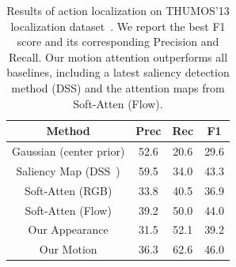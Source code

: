 \documentclass[10pt,twocolumn,letterpaper]{article}
\begin{document}
\begin{table}
\centering
\footnotesize
\begin{tabular}{c|ccc}
Method                                  & Prec        & Rec   & F1    \\ \hline 
Gaussian (center prior)                 & 52.6        & 20.6     & 29.6  \\ 
Saliency Map (DSS~\cite{hou2017deeply}) & 59.5        & 34.0     & 43.3  \\ 
Soft-Atten (RGB)                        & 33.8        & 40.5     & 36.9  \\ 
Soft-Atten (Flow)                       & 39.2        & 50.0     & 44.0  \\ 
Our Appearance                          & 31.5        & 52.1     & 39.2  \\ 
Our Motion                              & 36.3        & 62.6     & 46.0  \\ 
\end{tabular}
\vspace{0.1em}
\caption{Results of action localization on THUMOS'13 localization dataset~\cite{idrees2017thumos}. We report the best F1 score and its corresponding Precision and Recall. Our motion attention outperforms all baselines, including a latest saliency detection method (DSS) and the attention maps from Soft-Atten (Flow).}
\label{table:Localization}
\end{table}
\end{document}
